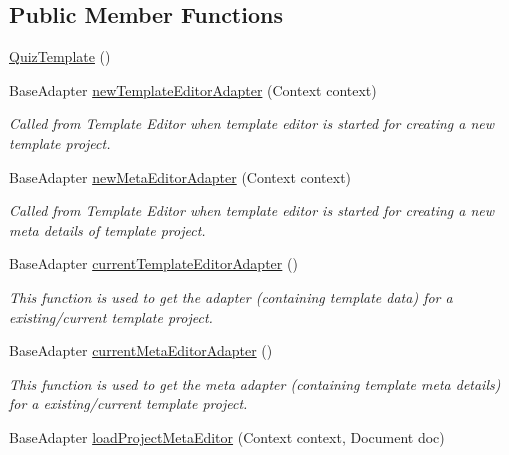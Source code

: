 \subsection*{Public Member Functions}
\begin{DoxyCompactItemize}
\item 
\hyperlink{classorg_1_1buildmlearn_1_1toolkit_1_1templates_1_1QuizTemplate_a564252fd818d44d1f9d2221f58f3eec5}{Quiz\+Template} ()
\item 
Base\+Adapter \hyperlink{classorg_1_1buildmlearn_1_1toolkit_1_1templates_1_1QuizTemplate_a47d3029ad563737e60c7c209738b0a71}{new\+Template\+Editor\+Adapter} (Context context)
\begin{DoxyCompactList}\small\item\em Called from Template Editor when template editor is started for creating a new template project. \end{DoxyCompactList}\item 
Base\+Adapter \hyperlink{classorg_1_1buildmlearn_1_1toolkit_1_1templates_1_1QuizTemplate_aee4a8c4bf17f33d9dd362e3160b67975}{new\+Meta\+Editor\+Adapter} (Context context)
\begin{DoxyCompactList}\small\item\em Called from Template Editor when template editor is started for creating a new meta details of template project. \end{DoxyCompactList}\item 
Base\+Adapter \hyperlink{classorg_1_1buildmlearn_1_1toolkit_1_1templates_1_1QuizTemplate_ab1d89e08da401108f6a6ec7bf208c973}{current\+Template\+Editor\+Adapter} ()
\begin{DoxyCompactList}\small\item\em This function is used to get the adapter (containing template data) for a existing/current template project. \end{DoxyCompactList}\item 
Base\+Adapter \hyperlink{classorg_1_1buildmlearn_1_1toolkit_1_1templates_1_1QuizTemplate_ab9912c5d447a017a404bb4683b751d40}{current\+Meta\+Editor\+Adapter} ()
\begin{DoxyCompactList}\small\item\em This function is used to get the meta adapter (containing template meta details) for a existing/current template project. \end{DoxyCompactList}\item 
Base\+Adapter \hyperlink{classorg_1_1buildmlearn_1_1toolkit_1_1templates_1_1QuizTemplate_ae6788b65da8c1691a4bb9f9cd0f10000}{load\+Project\+Meta\+Editor} (Context context, Document doc)

\end{DoxyCompactItemize}
